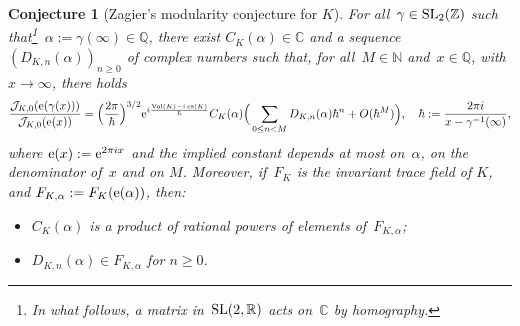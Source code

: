 \documentclass[11pt]{amsart}
\newcommand{\R}{\mathbb{R}}
\newcommand{\Q}{\mathbb{Q}}
\newcommand{\C}{\mathbb{C}}
\newcommand{\N}{\mathbb{N}}
\newcommand{\Z}{\mathbb{Z}}
\newcommand{\J}{\mathcal{J}}
\newcommand{\tn}[1]{\textnormal{#1}}
\newtheorem{conj}[ezer]{Conjecture}
\theoremstyle{definition}
\newcommand{\pr}[1]{\mathchoice{\left( #1\right)}{(#1)}{(#1)}{(#1)}}
\newcommand{\e}[1][]{\ifthenelse{\equal{#1}{}}{{\rm e}}{\operatorname{e}\pr{ #1}}}
\DeclareMathOperator{\Vol}{Vol}
\DeclareMathOperator{\cs}{cs}
\newcommand{\1}{{\mathbf 1}}
\newcommand{\SL}{\tn{SL}}
\let\originalleft\left
\let\originalright\right
\renewcommand{\left}{\mathopen{}\mathclose\bgroup\originalleft}
\renewcommand{\right}{\aftergroup\egroup\originalright}
\numberwithin{equation}{section}
\begin{document}
\begin{conj}[Zagier's modularity conjecture for $K$]\label{conj:zagier}
  For all~$\gamma\in\SL_2(\Z)$ such that\footnote{In what follows, a matrix in~$\SL(2, \R)$ acts on~$\C$ by homography.}~$\alpha:= \gamma(\infty) \in\Q$, there exist $C_K(\alpha)\in\C$ and a sequence~$(D_{K,n}(\alpha))_{n\geq 0}$ of complex numbers such that, for all~$M\in\N$ and~$x\in\Q$, with $x\to\infty$, there holds
  \begin{equation}\label{eq:J0-approxmod}
    \frac{\J_{K,0}(\e[\gamma(x))]}{\J_{K,0}(\e[x])} = \Big(\frac{2\pi}{\hbar}\Big)^{3/2}\e^{i\frac{\Vol (K)-i\cs (K)}{\hbar}} C_K(\alpha)\Big(\sum_{0\leq n < M} D_{K,n}(\alpha) \hbar^{n} + O(\hbar^{M})\Big), \quad \hbar:=\frac{2\pi i}{x-\gamma^{-1}(\infty)},
  \end{equation}
  where $\e[x]:=\e^{2\pi i x}$ and the implied constant depends at most on~$\alpha$, on the denominator of~$x$ and on $M$. Moreover, if~$F_K$ is the invariant trace field of $K$, and $F_{K,\alpha}:=F_K(\e[\alpha])$, then:
  \begin{itemize}
  \item $C_K(\alpha)$ is a product of rational powers of elements of~$F_{K,\alpha}$;
  \item $D_{K,n}(\alpha)\in F_{K,\alpha}$ for $n\geq0$.
  \end{itemize}
\end{conj}
\end{document}
